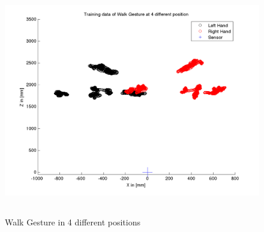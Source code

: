 \begin{figure}
	[h] \centering 
	\includegraphics[height=10cm]{figures/result/train-walk-all.png} \caption{Walk Gesture in 4 different positions} \label{pl:ges:pos} 
\end{figure}
